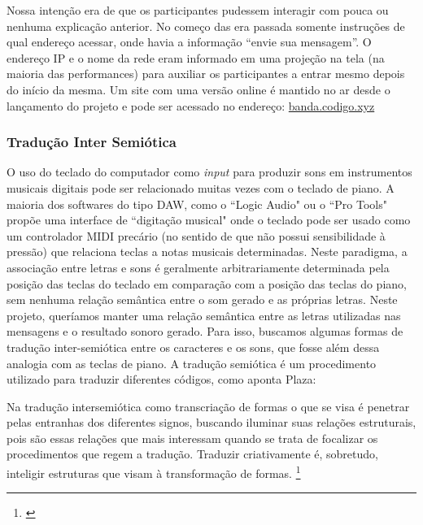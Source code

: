 Nossa intenção era de que os participantes pudessem interagir com pouca ou nenhuma explicação anterior. No começo das era passada somente instruções de qual endereço acessar, onde havia a informação ``envie sua mensagem''. O endereço IP e o nome da rede eram informado em uma projeção na tela (na maioria das performances) para auxiliar os participantes a entrar mesmo depois do início da mesma. Um site com uma versão online é mantido no ar desde o lançamento do projeto e pode ser acessado no endereço: \url{banda.codigo.xyz}




\subsubsection{Tradução Inter Semiótica}
\label{sec:trad}

O uso do teclado do computador como \emph{input} para produzir sons em instrumentos musicais digitais pode ser relacionado muitas vezes com o teclado de piano. A maioria dos softwares do tipo DAW, como o ``Logic Audio" ou o ``Pro Tools" propõe uma interface de ``digitação musical" onde o teclado pode ser usado como um controlador MIDI precário (no sentido de que não possui sensibilidade à pressão) que relaciona teclas a notas musicais determinadas. Neste paradigma, a associação entre letras e sons é geralmente arbitrariamente determinada pela posição das teclas do teclado em comparação com a posição das teclas do piano, sem nenhuma relação semântica entre o som gerado e as próprias letras. Neste projeto, queríamos manter uma relação semântica entre as letras utilizadas nas mensagens e o resultado sonoro gerado. Para isso, buscamos algumas formas de tradução inter-semiótica entre os caracteres e os sons, que fosse além dessa analogia com as teclas de piano. A tradução semiótica é um procedimento utilizado para traduzir diferentes códigos, como aponta Plaza: 

\begin{citacao}
Na tradução intersemiótica como transcriação de formas o que se visa é penetrar pelas entranhas dos diferentes signos, buscando iluminar suas relações estruturais, pois são essas relações que mais interessam quando se trata de focalizar os procedimentos que regem a tradução. Traduzir criativamente é, sobretudo, inteligir estruturas que visam à transformação de formas. \footnote{\cite[71]{JulioPlaza1969}}
\end{citacao}

